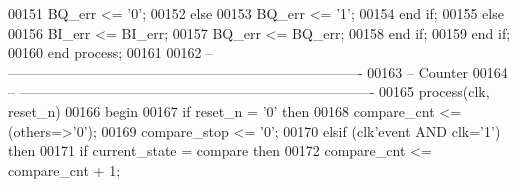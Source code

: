 \begin{DoxyCode}
00151                \textcolor{vhdlchar}{BQ_err} \textcolor{vhdlchar}{<=} \textcolor{vhdlchar}{'}\textcolor{vhdllogic}{}\textcolor{vhdllogic}{0}\textcolor{vhdlchar}{'};
00152             \textcolor{keywordflow}{else} 
00153                \textcolor{vhdlchar}{BQ_err} \textcolor{vhdlchar}{<=} \textcolor{vhdlchar}{'}\textcolor{vhdllogic}{}\textcolor{vhdllogic}{1}\textcolor{vhdlchar}{'};
00154             \textcolor{keywordflow}{end} \textcolor{keywordflow}{if};  
00155          \textcolor{keywordflow}{else} 
00156             \textcolor{vhdlchar}{BI_err} \textcolor{vhdlchar}{<=} \textcolor{vhdlchar}{BI_err};
00157             \textcolor{vhdlchar}{BQ_err} \textcolor{vhdlchar}{<=} \textcolor{vhdlchar}{BQ_err};
00158          \textcolor{keywordflow}{end} \textcolor{keywordflow}{if};
00159       \textcolor{keywordflow}{end} \textcolor{keywordflow}{if};
00160    \textcolor{keywordflow}{end} \textcolor{keywordflow}{process};
00161    
00162 \textcolor{keyword}{-- ----------------------------------------------------------------------------}
00163 \textcolor{keyword}{-- Counter}
00164 \textcolor{keyword}{-- ----------------------------------------------------------------------------  }
00165    \textcolor{keywordflow}{process}(clk, reset_n)
00166 \textcolor{vhdlkeyword}{   begin}
00167       \textcolor{keywordflow}{if} \textcolor{vhdlchar}{reset_n} \textcolor{vhdlchar}{=} \textcolor{vhdlchar}{'}\textcolor{vhdllogic}{}\textcolor{vhdllogic}{0}\textcolor{vhdlchar}{'} \textcolor{keywordflow}{then} 
00168          \textcolor{vhdlchar}{compare_cnt}    \textcolor{vhdlchar}{<=} \textcolor{vhdlchar}{(}\textcolor{keywordflow}{others}\textcolor{vhdlchar}{=}\textcolor{vhdlchar}{>}\textcolor{vhdlchar}{'}\textcolor{vhdllogic}{}\textcolor{vhdllogic}{0}\textcolor{vhdlchar}{'}\textcolor{vhdlchar}{)};
00169          \textcolor{vhdlchar}{compare_stop}   \textcolor{vhdlchar}{<=} \textcolor{vhdlchar}{'}\textcolor{vhdllogic}{}\textcolor{vhdllogic}{0}\textcolor{vhdlchar}{'};
00170       \textcolor{keywordflow}{elsif} \textcolor{vhdlchar}{(}\textcolor{vhdlchar}{clk}\textcolor{vhdlchar}{'}\textcolor{vhdlkeyword}{event} \textcolor{keywordflow}{AND} \textcolor{vhdlchar}{clk}\textcolor{vhdlchar}{=}\textcolor{vhdlchar}{'}\textcolor{vhdllogic}{}\textcolor{vhdllogic}{1}\textcolor{vhdlchar}{'}\textcolor{vhdlchar}{)} \textcolor{keywordflow}{then}
00171          \textcolor{keywordflow}{if} \textcolor{vhdlchar}{current_state} \textcolor{vhdlchar}{=} \textcolor{vhdlchar}{compare} \textcolor{keywordflow}{then} 
00172             \textcolor{vhdlchar}{compare_cnt} \textcolor{vhdlchar}{<=} \textcolor{vhdlchar}{compare_cnt} \textcolor{vhdlchar}{+} \textcolor{vhdllogic}{}\textcolor{vhdllogic}{1};

\end{DoxyCode}
